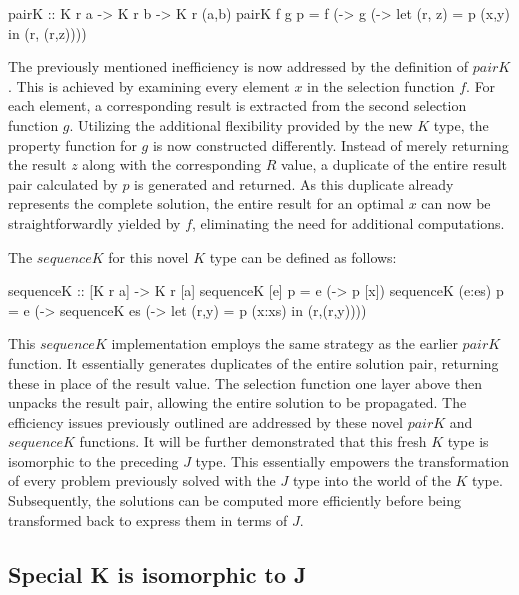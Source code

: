 \documentclass[runningheads]{llncs}
\begin{document}
\begin{code}
pairK :: K r a -> K r b -> K r (a,b)
pairK f g p = f (\x -> 
              g (\y -> let (r, z) = p (x,y) 
                       in (r, (r,z))))
\end{code}

The previously mentioned inefficiency is now addressed by the definition
of \(pairK\). This is achieved by examining every element \(x\) in the
selection function \(f\). For each element, a corresponding result is
extracted from the second selection function \(g\). Utilizing the
additional flexibility provided by the new \(K\) type, the property
function for \(g\) is now constructed differently. Instead of merely
returning the result \(z\) along with the corresponding \(R\) value, a
duplicate of the entire result pair calculated by \(p\) is generated and
returned. As this duplicate already represents the complete solution,
the entire result for an optimal \(x\) can now be straightforwardly
yielded by \(f\), eliminating the need for additional computations.

The \(sequenceK\) for this novel \(K\) type can be defined as follows:

\begin{code}
sequenceK :: [K r a] -> K r [a]
sequenceK [e] p    = e (\x -> p [x])
sequenceK (e:es) p = e (\x -> sequenceK es 
                       (\xs -> let (r,y) = p (x:xs) 
                               in (r,(r,y))))
\end{code}

This \(sequenceK\) implementation employs the same strategy as the
earlier \(pairK\) function. It essentially generates duplicates of the
entire solution pair, returning these in place of the result value. The
selection function one layer above then unpacks the result pair,
allowing the entire solution to be propagated. The efficiency issues
previously outlined are addressed by these novel \(pairK\) and
\(sequenceK\) functions. It will be further demonstrated that this fresh
\(K\) type is isomorphic to the preceding \(J\) type. This essentially
empowers the transformation of every problem previously solved with the
\(J\) type into the world of the \(K\) type. Subsequently, the solutions
can be computed more efficiently before being transformed back to
express them in terms of \(J\).

\subsection{Special K is isomorphic to
J}\label{special-k-is-isomorphic-to-j}
\end{document}
